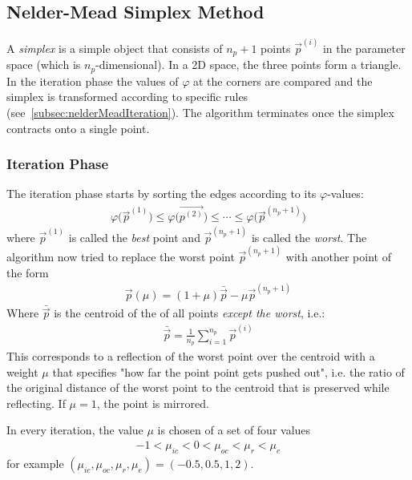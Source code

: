 		\subsection{Nelder-Mead Simplex Method}
			A \emph{simplex} is a simple object that consists of \( n_p + 1 \) points \( \vec{p}^{(i)} \) in the parameter space (which is \(n_p\)-dimensional). In a 2D space, the three points form a triangle. In the iteration phase the values of \(\varphi\) at the corners are compared and the simplex is transformed according to specific rules (see~\autoref{subsec:nelderMeadIteration}). The algorithm terminates once the simplex contracts onto a single point.

			\subsubsection{Iteration Phase}
				\label{subsec:nelderMeadIteration}

				The iteration phase starts by sorting the edges according to its \(\varphi\)-values:
				\begin{align*}
					\varphi\big(\vec{p}^{(1)}\big) \leq \varphi\big(\vec{p^{(2)}}\big) \leq \cdots \leq \varphi\big(\vec{p}^{(n_p + 1)}\big)
				\end{align*}
				where \( \vec{p}^{(1)} \) is called the \emph{best} point and \( \vec{p}^{(n_p + 1)} \) is called the \emph{worst}. The algorithm now tried to replace the worst point \( \vec{p}^{(n_p + 1)} \) with another point of the form
				\begin{align*}
					\vec{p}(\mu) = (1 + \mu) \bar{\vec{p}} - \mu \vec{p}^{(n_p + 1)}
				\end{align*}
				Where \(\bar{\vec{p}}\) is the centroid of the of all points \emph{except the worst}, i.e.:
				\begin{align*}
					\bar{\vec{p}} = \frac{1}{n_p} \sum_{i = 1}^{n_p} \vec{p}^{(i)}
				\end{align*}
				This corresponds to a reflection of the worst point over the centroid with a weight \(\mu\) that specifies "how far the point point gets pushed out", i.e. the ratio of the original distance of the worst point to the centroid that is preserved while reflecting. If \(\mu = 1\), the point is mirrored.

				In every iteration, the value \(\mu\) is chosen of a set of four values
				\begin{align*}
					-1 < \mu_{ic} < 0 < \mu_{oc} < \mu_{r} < \mu_{e}
				\end{align*}
				for example \( (\mu_{ic}, \mu_{oc}, \mu_r, \mu_\mathit{e}) = (-0.5, 0.5, 1, 2) \).

